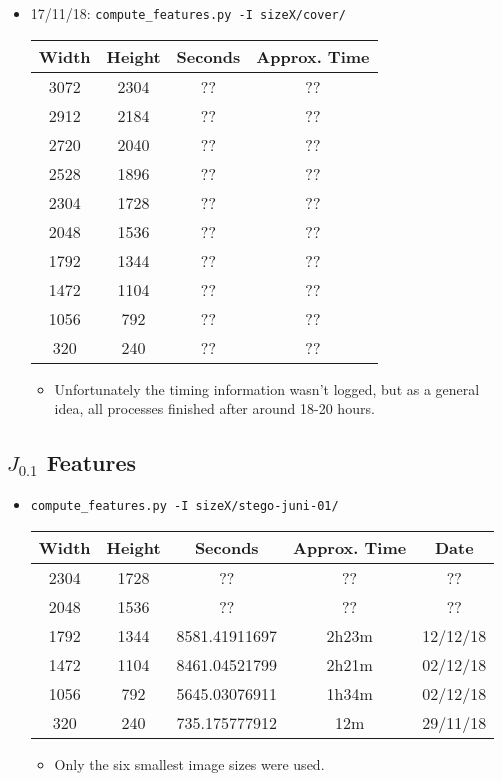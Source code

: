 \documentclass[11pt,a4paper]{report}
\begin{document}
\begin{itemize}
\item 17/11/18: \texttt{compute\_features.py -I sizeX/cover/}
  \begin{center}
  \begin{tabular}{ c c | c c }
  Width & Height & Seconds & Approx. Time \\ \hline
  3072 & 2304 & ?? & ?? \\
  2912 & 2184 & ?? & ?? \\
  2720 & 2040 & ?? & ?? \\
  2528 & 1896 & ?? & ?? \\
  2304 & 1728 & ?? & ?? \\
  2048 & 1536 & ?? & ?? \\ 
  1792 & 1344 & ?? & ?? \\
  1472 & 1104 & ?? & ?? \\
  1056 & 792 & ?? & ?? \\
  320 & 240 & ?? & ?? \\
  \end{tabular}
  \end{center}
  \begin{itemize}
  \item Unfortunately the timing information wasn't logged, but as a general idea, all processes finished after around 18-20 hours.
  \end{itemize}
\end{itemize}

\subsection{$J_{0.1}$ Features}
\begin{itemize}
\item \texttt{compute\_features.py -I sizeX/stego-juni-01/}
  \begin{center}
  \begin{tabular}{ c c | c c c }
  Width & Height & Seconds & Approx. Time & Date \\ \hline
  2304 & 1728 & ?? & ?? & ?? \\
  2048 & 1536 & ?? & ?? & ?? \\
  1792 & 1344 & 8581.41911697 & 2h23m & 12/12/18 \\
  1472 & 1104 & 8461.04521799 & 2h21m & 02/12/18 \\
  1056 & 792 & 5645.03076911 & 1h34m & 02/12/18 \\
  320 & 240 & 735.175777912 & 12m & 29/11/18 \\
  \end{tabular}
  \end{center}
  \begin{itemize}
  \item Only the six smallest image sizes were used.
  \end{itemize}
\end{itemize}
\end{document}
